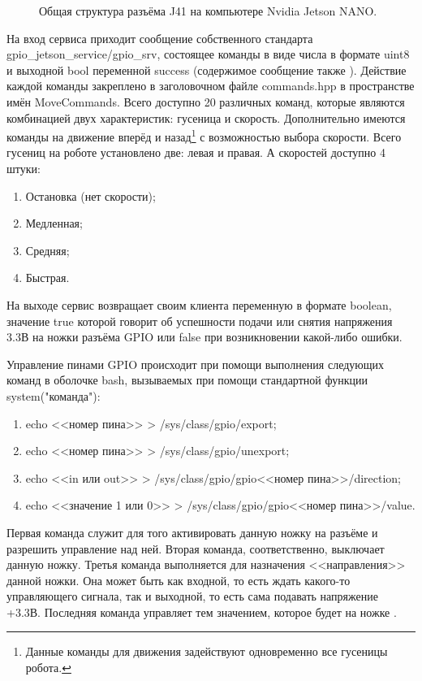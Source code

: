 \begin{figure}[ht]
  \caption{Общая структура разъёма J41 на компьютере Nvidia Jetson NANO.}\label{fig:jetson-gpio}
\end{figure}

На вход сервиса приходит сообщение собственного стандарта gpio\_jetson\_service/gpio\_srv, состоящее команды в виде числа в формате uint8 и выходной bool переменной success (содержимое сообщение также ). Действие каждой команды закреплено в заголовочном файле commands.hpp в пространстве имён MoveCommands. Всего доступно 20 различных команд, которые являются комбинацией двух характеристик: гусеница и скорость. Дополнительно имеются команды на движение вперёд и назад\footnote{Данные команды для движения задействуют одновременно все гусеницы робота.} с возможностью выбора скорости. Всего гусениц на роботе установлено две: левая и правая. А скоростей доступно 4 штуки:

\begin{enumerate}
\item Остановка (нет скорости);
\item Медленная;
\item Средняя;
\item Быстрая.
\end{enumerate}

На выходе сервис возвращает своим клиента переменную в формате boolean, значение true которой говорит об успешности подачи или снятия напряжения 3.3В на ножки разъёма GPIO или false при возникновении какой-либо ошибки.

Управление пинами GPIO происходит при помощи выполнения следующих команд в оболочке bash, вызываемых при помощи стандартной функции system("команда"):
\begin{enumerate}
\item echo <<номер пина>> > /sys/class/gpio/export;
\item echo <<номер пина>> > /sys/class/gpio/unexport;
\item echo <<in или out>> > /sys/class/gpio/gpio<<номер пина>>/direction;
\item echo <<значение 1 или 0>> > /sys/class/gpio/gpio<<номер пина>>/value.
\end{enumerate} 

Первая команда служит для того активировать данную ножку на разъёме и разрешить управление над ней. Вторая команда, соответственно, выключает данную ножку. Третья команда выполняется для назначения <<направления>> данной ножки. Она может быть как входной, то есть ждать какого-то управляющего сигнала, так и выходной, то есть сама подавать напряжение +3.3В. Последняя команда управляет тем значением, которое будет на ножке .

